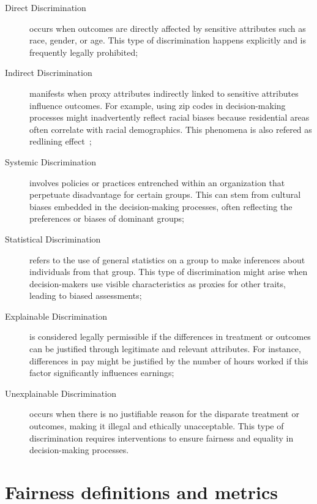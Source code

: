 \begin{description}
    \item[Direct Discrimination] occurs when outcomes are directly affected by sensitive attributes such as race, gender, or age. This type of discrimination happens explicitly and is frequently legally prohibited;
    
    \item[Indirect Discrimination] manifests when proxy attributes indirectly linked to sensitive attributes influence outcomes. For example, using zip codes in decision-making processes might inadvertently reflect racial biases because residential areas often correlate with racial demographics. This phenomena is also refered as redlining effect~\citep{Pedreschi2008};
    
    \item[Systemic Discrimination] involves policies or practices entrenched within an organization that perpetuate disadvantage for certain groups. This can stem from cultural biases embedded in the decision-making processes, often reflecting the preferences or biases of dominant groups;
    
    \item[Statistical Discrimination] refers to the use of general statistics on a group to make inferences about individuals from that group. This type of discrimination might arise when decision-makers use visible characteristics as proxies for other traits, leading to biased assessments;
    
    \item[Explainable Discrimination] is considered legally permissible if the differences in treatment or outcomes can be justified through legitimate and relevant attributes. For instance, differences in pay might be justified by the number of hours worked if this factor significantly influences earnings;
    
    \item[Unexplainable Discrimination] occurs when there is no justifiable reason for the disparate treatment or outcomes, making it illegal and ethically unacceptable. This type of discrimination requires interventions to ensure fairness and equality in decision-making processes.
\end{description}


\section{Fairness definitions and metrics}

